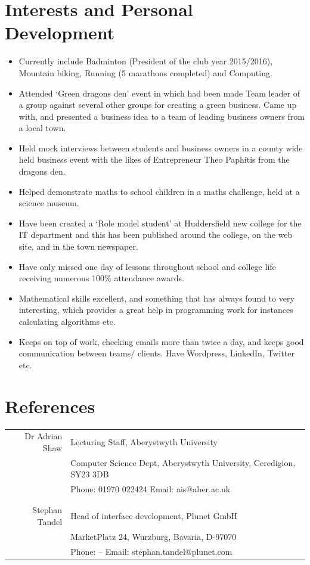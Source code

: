 \documentclass[a4paper,10pt]{article}
\begin{document}
\section{Interests and Personal Development}
\begin{itemize}
\item Currently include Badminton (President of the club year 2015/2016), Mountain biking, Running (5 marathons completed) and Computing.
\item Attended ‘Green dragons den’ event in which had been made Team leader of a group against several other groups for creating a green business. Came up with, and presented a business idea to a team of leading business owners from a local town.
\item Held mock interviews between students and business owners in a county wide held business event with the likes of Entrepreneur Theo Paphitis from the dragons den.
\item Helped demonstrate maths to school children in a maths challenge, held at a science museum.
\item Have been created a ‘Role model student’ at Huddersfield new college for the IT department and this has been published around the college, on the web site, and in the town newspaper. 
\item Have only missed one day of lessons throughout school and college life receiving numerous 100\% attendance awards.
\item Mathematical skills excellent, and something that has always found to very interesting, which provides a great help in programming work for instances calculating algorithms etc.
\item Keeps on top of work, checking emails more than twice a day, and keeps good communication between teams/ clients. Have Wordpress, LinkedIn, Twitter etc.
\end{itemize}

\section{References}
\begin{tabular}{r|p{12cm}}
 Dr Adrian Shaw & Lecturing Staff, Aberystwyth University \\
 & Computer Science Dept, Aberystwyth University, Ceredigion, SY23 3DB \\
 & Phone: 01970 022424       Email: ais@aber.ac.uk \\ 
 &  \\
     \hline \\
  Stephan Tandel & Head of interface development, Plunet GmbH \\
 & MarketPlatz 24, Wurzburg, Bavaria, D-97070 \\
 & Phone: --       Email: stephan.tandel@plunet.com \\

\end{tabular}
\end{document}

